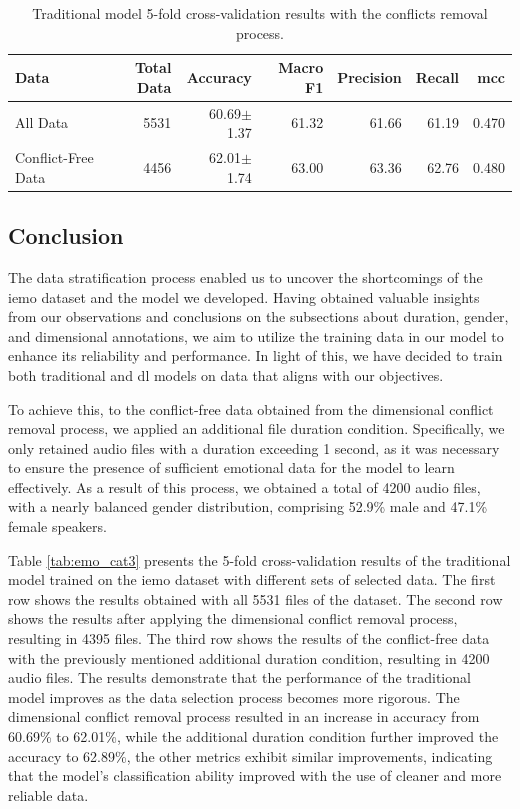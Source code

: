 \begin{table}[H]
	\small
	\centering
	\caption{Traditional model 5-fold cross-validation results with the conflicts removal process.}
	\label{tab:emo_cat2}
	\centering
	\begin{tabular}{lrrrrrr}
		\toprule
		Data   & Total Data						 	& Accuracy    & Macro F1    & Precision   & Recall      & \ac{mcc}       \\
		\midrule
		All Data & 5531 & 60.69$\pm$1.37 & 61.32 & 61.66 & 61.19 & 0.470 \\
		Conflict-Free Data & 4456 & 62.01$\pm$1.74 & 63.00 & 63.36 & 62.76 & 0.480 \\
		\bottomrule
	\end{tabular}
\end{table}


\subsection{Conclusion}

The data stratification process enabled us to uncover the shortcomings of the \ac{iemo} dataset and the model we developed. Having obtained valuable insights from our observations and conclusions on the subsections about duration, gender, and dimensional annotations, we aim to utilize the training data in our model to enhance its reliability and performance. In light of this, we have decided to train both traditional and \ac{dl} models on data that aligns with our objectives.

To achieve this, to the conflict-free data obtained from the dimensional conflict removal process, we applied an additional file duration condition. Specifically, we only retained audio files with a duration exceeding 1 second, as it was necessary to ensure the presence of sufficient emotional data for the model to learn effectively. As a result of this process, we obtained a total of 4200 audio files, with a nearly balanced gender distribution, comprising 52.9\% male and 47.1\% female speakers.

Table \ref{tab:emo_cat3} presents the 5-fold cross-validation results of the traditional model trained on the \ac{iemo} dataset with different sets of selected data. The first row shows the results obtained with all 5531 files of the dataset. The second row shows the results after applying the dimensional conflict removal process, resulting in 4395 files. The third row shows the results of the conflict-free data with the previously mentioned additional duration condition, resulting in 4200 audio files. The results demonstrate that the performance of the traditional model improves as the data selection process becomes more rigorous. The dimensional conflict removal process resulted in an increase in accuracy from 60.69\% to 62.01\%, while the additional duration condition further improved the accuracy to 62.89\%, the other metrics exhibit similar improvements, indicating that the model's classification ability improved with the use of cleaner and more reliable data.

